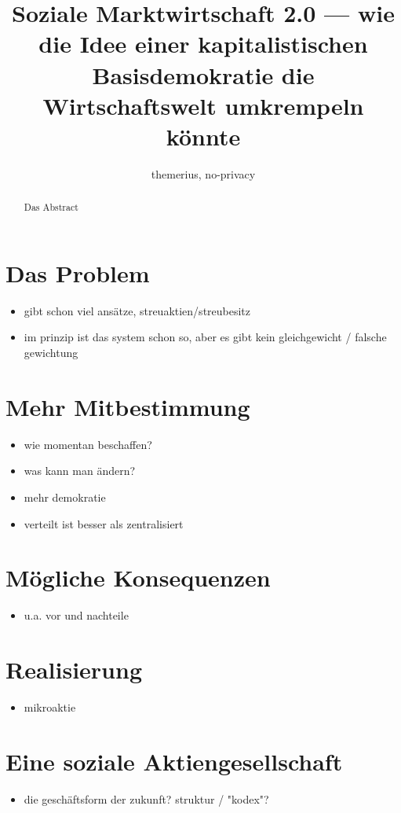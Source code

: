\documentclass[a4paper, 10pt, twocolumn]{article}
\begin{document}
\author{themerius, no-privacy} 
\title{Soziale Marktwirtschaft 2.0 — wie die Idee einer
kapitalistischen Basisdemokratie die
Wirtschaftswelt umkrempeln könnte}
\maketitle

\begin{abstract}
Das Abstract
\end{abstract}

\section{Das Problem}
\begin{itemize}
    \item gibt schon viel ansätze, streuaktien/streubesitz
    \item im prinzip ist das system schon so, aber es gibt kein
          gleichgewicht / falsche gewichtung
\end{itemize}

\section{Mehr Mitbestimmung}
\begin{itemize}
    \item wie momentan beschaffen?
    \item was kann man ändern?
    \item mehr demokratie
    \item verteilt ist besser als zentralisiert
\end{itemize}

\section{Mögliche Konsequenzen}
\begin{itemize}
    \item u.a. vor und nachteile
\end{itemize}

\section{Realisierung}
\begin{itemize}
    \item mikroaktie
\end{itemize}

\section{Eine soziale Aktiengesellschaft}
\begin{itemize}
    \item die geschäftsform der zukunft? struktur / "kodex"?
\end{itemize}
\end{document}
